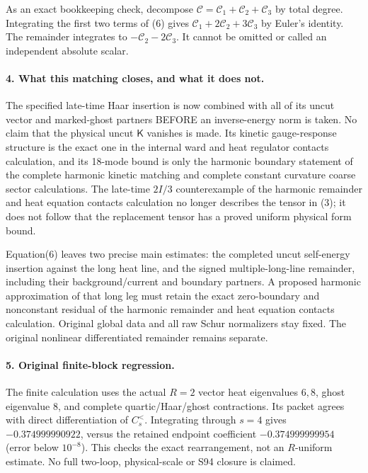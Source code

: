 \documentclass[11pt]{article}
\begin{document}
As an exact bookkeeping check, decompose
$\mathcal C=\mathcal C_1+\mathcal C_2+\mathcal C_3$ by total degree.
Integrating the first two terms of (6) gives
$\mathcal C_1+2\mathcal C_2+3\mathcal C_3$ by Euler's identity.
The remainder integrates to $-\mathcal C_2-2\mathcal C_3$.
It cannot be omitted or called an independent absolute scalar.

\paragraph{4. What this matching closes, and what it does not.}
The specified late-time Haar insertion is now combined with all of its
uncut vector and marked-ghost partners BEFORE an inverse-energy norm
is taken. No claim that the physical uncut $\mathsf K$ vanishes is made.
Its kinetic gauge-response structure is the exact one in the internal ward and heat regulator contacts calculation, and its
18-mode bound is only the harmonic boundary statement of the complete harmonic kinetic matching and complete constant curvature coarse sector calculations.
The late-time $2I/3$ counterexample of the harmonic remainder and heat equation contacts calculation no longer describes the tensor
in (3); it does not follow that the replacement tensor has a proved
uniform physical form bound.

Equation(6) leaves two precise main estimates: the completed uncut
self-energy insertion against the long heat line, and the signed
multiple-long-line remainder, including their background/current
and boundary partners. A proposed harmonic approximation of that
long leg must retain the exact zero-boundary and nonconstant residual
of the harmonic remainder and heat equation contacts calculation. Original global data and all raw Schur normalizers stay fixed.
The original nonlinear differentiated remainder remains separate.

\paragraph{5. Original finite-block regression.}
The finite calculation uses the actual
$R=2$ vector heat eigenvalues $6,8$, ghost eigenvalue $8$, and complete
quartic/Haar/ghost contractions. Its packet agrees with direct
differentiation of $C_s^{<}$. Integrating through $s=4$ gives
$-0.374999990922$, versus the retained endpoint coefficient
$-0.374999999954$ (error below $10^{-8}$).
This checks the exact rearrangement, not an $R$-uniform estimate.
No full two-loop, physical-scale or S94 closure is claimed.
\end{document}
